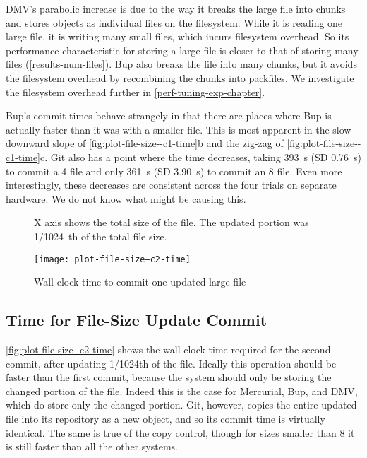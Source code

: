 DMV's parabolic increase is due to the way it breaks the large file into chunks
and stores objects as individual files on the filesystem. While it is reading
one large file, it is writing many small files, which incurs filesystem
overhead. So its performance characteristic for storing a large file is closer
to that of storing many files (\autoref{results-num-files}). Bup also breaks the
file into many chunks, but it avoids the filesystem overhead by recombining the
chunks into \glspl{packfile}. We investigate the filesystem overhead further in
\autoref{perf-tuning-exp-chapter}.

Bup's commit times behave strangely in that there are places where Bup is
actually faster than it was with a smaller file. This is most apparent in the
slow downward slope of \autoref{fig:plot-file-size--c1-time}b and the zig-zag of
\autoref{fig:plot-file-size--c1-time}c. Git also has a point where the time
decreases, taking \SI{393}{\s} (SD \SI{.76}{\s}) to commit a \SI{4}{\gib} file
and only \SI{361}{\s} (SD \SI{3.90}{\s}) to commit an \SI{8}{\gib} file. Even
more interestingly, these decreases are consistent across the four trials on
separate hardware. We do not know what might be causing this.

%


\begin{figure}[p]
    \begin{leftfullpage}
        \caption{Wall-clock time to commit one updated large file}
        \label{fig:plot-file-size--c2-time}
        \centering

        \explainlogsubfig

        X axis shows the total size of the file. The updated portion was
        \SI{1/1024}{th} of the total file size.

        \texttt{[image: plot-file-size--c2-time]}
    \end{leftfullpage}
\end{figure}

\cleardoublepage

\subsection{Time for File-Size Update Commit}
\label{results-file-size--c2-time}

\autoref{fig:plot-file-size--c2-time} shows the wall-clock time required for the
second \gls{commit}, after updating \num{1/1024}th of the file. Ideally this
operation should be faster than the first \gls{commit}, because the system
should only be storing the changed portion of the file. Indeed this is the case
for Mercurial, Bup, and \gls{DMV}, which do store only the changed portion. Git,
however, copies the entire updated file into its \gls{repository} as a new
object, and so its \gls{commit} time is virtually identical. The same is true of
the copy control, though for sizes smaller than \SI{8}{\gib} it is still faster
than all the other systems.

